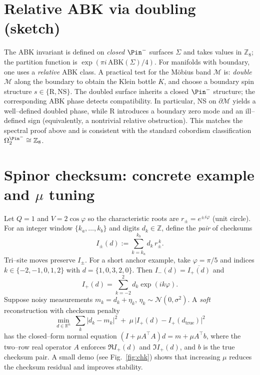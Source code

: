 \documentclass[11pt]{article}
\theoremstyle{definition}
\theoremstyle{remark}
\begin{document}
\section{Relative ABK via doubling (sketch)}
The ABK invariant is defined on \emph{closed} $\Pin^-$ surfaces $\Sigma$ and takes values in $\mathbb{Z}_8$; the partition function is
$\exp(\pi i\,\mathrm{ABK}(\Sigma)/4)$. For manifolds with boundary, one uses a \emph{relative} ABK class.
A practical test for the M\"obius band $\mathcal{M}$ is: \emph{double} $\mathcal{M}$ along the boundary to obtain the Klein bottle $K$,
and choose a boundary spin structure $s\in\{\mathrm{R},\mathrm{NS}\}$. The doubled surface inherits a closed $\Pin^-$ structure; the corresponding ABK phase detects compatibility.
In particular, NS on $\partial\mathcal{M}$ yields a well--defined doubled phase, while R introduces a boundary zero mode and an ill--defined sign (equivalently, a nontrivial relative obstruction). This matches the spectral proof above and is consistent with the standard cobordism classification $\Omega^{\Pin^-}_2\cong\mathbb{Z}_8$.

\section{Spinor checksum: concrete example and $\mu$ tuning}\label{sec:checksum}
Let $Q=1$ and $V=2\cos\varphi$ so the characteristic roots are $r_\pm=e^{\pm i\varphi}$ (unit circle). For an integer window $\{k_a,\dots,k_b\}$ and digits $d_k\in\mathbb{Z}$, define the \emph{pair} of checksums
\begin{equation}
I_\pm(d):=\sum_{k=k_a}^{k_b} d_k\,r_\pm^{\,k}.
\end{equation}
Tri--site moves preserve $I_\pm$. For a short anchor example, take $\varphi=\pi/5$ and indices $k\in\{-2,-1,0,1,2\}$ with
$d=\{1,0,3,2,0\}$. Then $I_-(d)=\overline{I_+(d)}$ and
\begin{equation}
I_+(d)=\sum_{k=-2}^{2} d_k \exp(i k\varphi).
\end{equation}
Suppose noisy measurements $m_k=d_k+\eta_k$, $\eta_k\sim \mathcal{N}(0,\sigma^2)$. A \emph{soft} reconstruction with checksum penalty
\begin{equation}
\min_{d\in\mathbb{R}^{n}} \ \sum_k |d_k-m_k|^2\ +\ \mu\,\bigl|I_+(d)-I_+(d_{\mathrm{true}})\bigr|^2
\end{equation}
has the closed--form normal equation $(I+\mu A^\top A)d = m + \mu A^\top b$, where the two--row real operator $A$ enforces $\Re I_+(d)$ and $\Im I_+(d)$, and $b$ is the true checksum pair.
A small demo (see Fig.~\ref{fig:chk}) shows that increasing $\mu$ reduces the checksum residual and improves stability.
\end{document}
